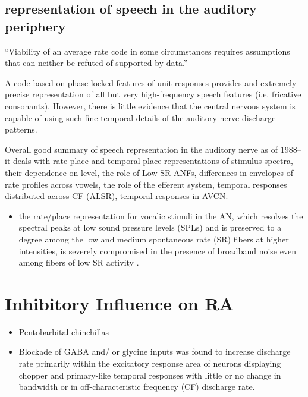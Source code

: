 \documentclass[10pt,a4paper]{article}
\begin{document}
\subsection{\citep{SachsWinslowEtAl:1988} representation of speech in the auditory periphery}

{\textquotedblleft}Viability of an average rate code in some circumstances
requires assumptions that can neither be refuted of supported by
data.{\textquotedblright}

A code based on phase-locked features of unit responses provides and extremely
precise representation of all but very high-frequency speech features
(i.e. fricative consonants).  However, there is little evidence that the central
nervous system is capable of using such fine temporal details of the auditory
nerve discharge patterns.

Overall good summary of speech representation in the auditory nerve as of 1988--
it deals with rate place and temporal-place representations of stimulus spectra,
their dependence on level, the role of Low SR ANFs, differences in envelopes of
rate profiles across vowels, the role of the efferent system, temporal responses
distributed across CF (ALSR), temporal responses in AVCN.

\citep{Geisler:1988}

\citep{RhodeGreenberg:1994b}


\begin{itemize}
\item the rate/place representation for vocalic stimuli in the AN, which
  resolves the spectral peaks at low sound pressure levels (SPLs) and is
  preserved to a degree among the low and medium spontaneous rate (SR) fibers at
  higher intensities, is severely compromised in the presence of broadband noise
  \citep{GeislerGamble:1989,SachsVoigtEtAl:1983} even among fibers of low SR
  activity \citep{SachsVoigtEtAl:1983,SilkesGeisler:1991}.
\end{itemize}

\section{Inhibitory Influence on RA}
\citep{CasparyBackoffEtAl:1994}


\begin{itemize}
\item Pentobarbital chinchillas
\item Blockade of GABA and/ or glycine inputs was found to increase discharge
  rate primarily within the excitatory response area of neurons displaying
  chopper and primary-like temporal responses with little or no change in
  bandwidth or in off-characteristic frequency (CF) discharge rate.
\end{itemize}
\end{document}
